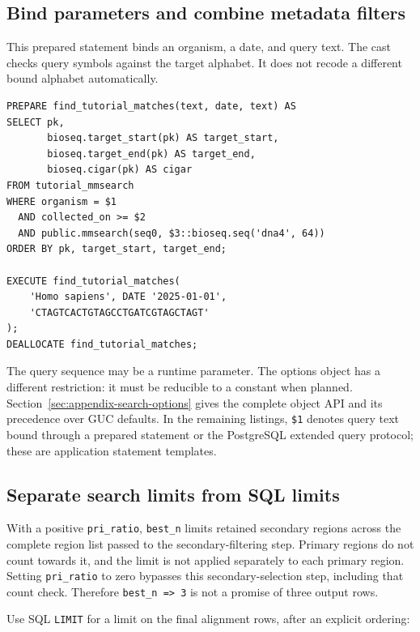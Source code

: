 \subsection{Bind parameters and combine metadata filters}

This prepared statement binds an organism, a date, and query text. The cast
checks query symbols against the target alphabet. It does not recode a
different bound alphabet automatically.

\par\noindent\begin{minipage}{\linewidth}
\begin{lstlisting}[style=bioseq-appendix-sql]
PREPARE find_tutorial_matches(text, date, text) AS
SELECT pk,
       bioseq.target_start(pk) AS target_start,
       bioseq.target_end(pk) AS target_end,
       bioseq.cigar(pk) AS cigar
FROM tutorial_mmsearch
WHERE organism = $1
  AND collected_on >= $2
  AND public.mmsearch(seq0, $3::bioseq.seq('dna4', 64))
ORDER BY pk, target_start, target_end;

EXECUTE find_tutorial_matches(
    'Homo sapiens', DATE '2025-01-01',
    'CTAGTCACTGTAGCCTGATCGTAGCTAGT'
);
DEALLOCATE find_tutorial_matches;
\end{lstlisting}
\end{minipage}

The query sequence may be a runtime parameter. The options object has a
different restriction: it must be reducible to a constant when planned.
Section~\ref{sec:appendix-search-options} gives the complete object API and
its precedence over GUC defaults. In the remaining listings, \texttt{\$1}
denotes query text bound through a prepared statement or the PostgreSQL
extended query protocol; these are application statement templates.

\subsection{Separate search limits from SQL limits}

With a positive \texttt{pri\_ratio}, \texttt{best\_n} limits retained
secondary regions across the complete region list passed to the
secondary-filtering step. Primary regions do not count towards it, and the
limit is not applied separately to each primary region.
Setting \texttt{pri\_ratio} to zero bypasses
this secondary-selection step, including that count check. Therefore
\texttt{best\_n => 3} is not a promise of three output rows.

Use SQL \texttt{LIMIT} for a limit on the final alignment rows, after an
explicit ordering:

